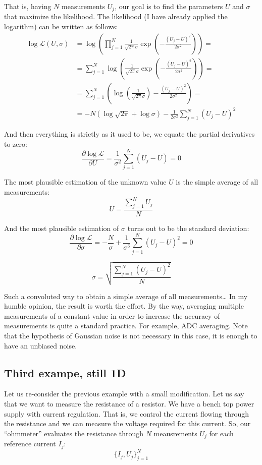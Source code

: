 \documentclass{article}
\begin{document}
That is, having $N$ measurements $U_j$, our goal is to find the parameters $U$ and $\sigma$ that maximize the likelihood.
The likelihood (I have already applied the logarithm) can be written as follows:
\begin{align*}
\log \mathcal{L}(U,\sigma) & = \log \left(\prod\limits_{j=1}^N  \frac{1}{\sqrt{2\pi}\sigma} \exp\left(-\frac{(U_j-U)^2}{2\sigma^2}\right)\right) =\\
& = \sum\limits_{j=1}^N \log \left(\frac{1}{\sqrt{2\pi}\sigma} \exp\left(-\frac{(U_j-U)^2}{2\sigma^2}\right)\right) = \\
& = \sum\limits_{j=1}^N \left(\log \left(\frac{1}{\sqrt{2\pi}\sigma}\right) -\frac{(U_j-U)^2}{2\sigma^2}\right) = \\
& = -N \left(\log\sqrt{2\pi} + \log\sigma\right) - \frac{1}{2\sigma^2} \sum\limits_{j=1}^N (U_j-U)^2
\end{align*}

And then everything is strictly as it used to be, we equate the partial derivatives to zero:
$$
\frac{\partial\log\mathcal{L}}{\partial U}    =  \frac{1}{\sigma^2}\sum\limits_{j=1}^N (U_j-U) = 0 
$$

The most plausible estimation of the unknown value $U$ is the simple average of all measurements:
$$
U = \frac{\sum\limits_{j=1}^N U_j}{N}
$$

And the most plausible estimation of $\sigma$ turns out to be the standard deviation:
$$
\frac{\partial\log\mathcal{L}}{\partial\sigma} =  -\frac{N}{\sigma} + \frac{1}{\sigma^3}\sum\limits_{j=1}^N (U_j-U)^2 = 0
$$

$$
\sigma = \sqrt{\frac{\sum\limits_{j=1}^N (U_j-U)^2}{N}} 
$$

Such a convoluted way to obtain a simple average of all measurements\dots
In my humble opinion, the result is worth the effort.
By the way, averaging multiple measurements of a constant value in order to increase the accuracy of measurements is quite a standard practice.
For example, ADC averaging. Note that the hypothesis of Gaussian noise is not necessary in this case, it is enough to have an unbiased noise.


\subsection{Third exampe, still 1D}

Let us re-consider the previous example with a small modification.
Let us say that we want to measure the resistance of a resistor.
We have a bench top power supply with current regulation.
That is, we control the current flowing through the resistance and we can measure the voltage required for this current.
So, our ``ohmmeter'' evaluates the resistance through $N$ meausrements $U_j$ for each reference current $I_j$:
$$
\{I_j, U_j\}_{j=1}^{N}
$$
\end{document}
